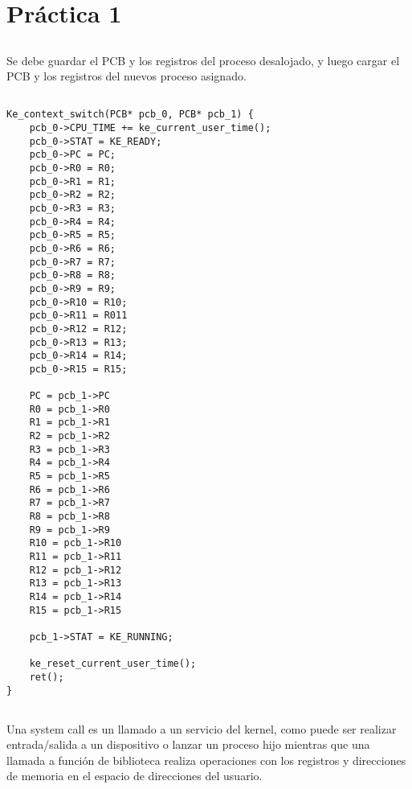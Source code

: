 \section{Práctica 1}

\subsection{}

Se debe guardar el PCB y los registros del proceso desalojado, y luego cargar
el PCB y los registros del nuevos proceso asignado.

\subsection{}

\begin{codesnippet}
\begin{verbatim}
Ke_context_switch(PCB* pcb_0, PCB* pcb_1) {
    pcb_0->CPU_TIME += ke_current_user_time();
    pcb_0->STAT = KE_READY;
    pcb_0->PC = PC;
    pcb_0->R0 = R0;
    pcb_0->R1 = R1;
    pcb_0->R2 = R2;
    pcb_0->R3 = R3;
    pcb_0->R4 = R4;
    pcb_0->R5 = R5;
    pcb_0->R6 = R6;
    pcb_0->R7 = R7;
    pcb_0->R8 = R8;
    pcb_0->R9 = R9;
    pcb_0->R10 = R10;
    pcb_0->R11 = R011
    pcb_0->R12 = R12;
    pcb_0->R13 = R13;
    pcb_0->R14 = R14;
    pcb_0->R15 = R15;

    PC = pcb_1->PC
    R0 = pcb_1->R0
    R1 = pcb_1->R1
    R2 = pcb_1->R2
    R3 = pcb_1->R3
    R4 = pcb_1->R4
    R5 = pcb_1->R5
    R6 = pcb_1->R6
    R7 = pcb_1->R7
    R8 = pcb_1->R8
    R9 = pcb_1->R9
    R10 = pcb_1->R10
    R11 = pcb_1->R11
    R12 = pcb_1->R12
    R13 = pcb_1->R13
    R14 = pcb_1->R14
    R15 = pcb_1->R15

    pcb_1->STAT = KE_RUNNING;

    ke_reset_current_user_time();
    ret();
}
\end{verbatim}
\end{codesnippet}

\subsection{}

Una system call es un llamado a un servicio del kernel, como puede ser
realizar entrada/salida a un dispositivo o lanzar un proceso hijo mientras que
una llamada a función de biblioteca realiza operaciones con los registros y
direcciones de memoria en el espacio de direcciones del usuario.

